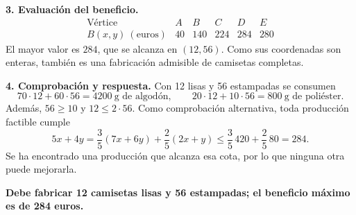\textbf{3. Evaluación del beneficio.}
\[
\begin{array}{c|rrrrr}
\text{Vértice}&A&B&C&D&E\\\hline
B(x,y)\ (\text{euros})&40&140&224&284&280
\end{array}
\]
El mayor valor es $284$, que se alcanza en $(12,56)$. Como sus coordenadas son enteras, también es una fabricación admisible de camisetas completas.

\textbf{4. Comprobación y respuesta.}
Con 12 lisas y 56 estampadas se consumen
\[
70\cdot12+60\cdot56=4200\ \text{g de algodón},\qquad
20\cdot12+10\cdot56=800\ \text{g de poliéster}.
\]
Además, $56\geq10$ y $12\leq2\cdot56$. Como comprobación alternativa, toda producción factible cumple
\[
5x+4y=\frac35(7x+6y)+\frac25(2x+y)
\leq\frac35\,420+\frac25\,80=284.
\]
Se ha encontrado una producción que alcanza esa cota, por lo que ninguna otra puede mejorarla.

\textbf{Debe fabricar 12 camisetas lisas y 56 estampadas; el beneficio máximo es de 284 euros.}
